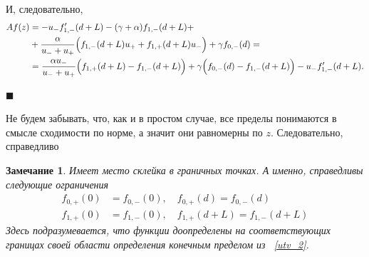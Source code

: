 \documentclass[12pt,a4paper]{article}
\newtheorem{zam}{Замечание}
\begin{document}
И, следовательно,
\begin{equation*}
    \begin{aligned}
   A f(z) &= -u_- f_{1,-}' (d + L) - (\gamma + \alpha) f_{1,-} (d + L) + \\
   &+ \frac{\alpha}{u_- + u_+} \Bigl(f_{1,-} (d + L) u_+ + f_{1,+} (d + L) u_- \Bigr) + \gamma f_{0,-} (d) = \\
& = \frac{\alpha u_-}{u_- + u_+} \Bigl(f_{1,+} (d + L) - f_{1,-} (d + L)\Bigr) + \gamma \Bigl( f_{0,-} (d) - f_{1,-} (d + L) \Bigr) - u_- f_{1,-}' (d + L).
    \end{aligned}
\end{equation*}
\begin{flushright}
$\blacksquare$
\end{flushright}

Не будем забывать, что, как и в простом случае, все пределы понимаются в смысле сходимости по норме, а значит они равномерны по $z$. Следовательно, справедливо
\begin{zam}
Имеет место склейка в граничных точках. А именно, справедливы следующие ограничения
\begin{equation}\label{restrict_2}
\begin{aligned} 
  f_{0, +}(0) &= f_{0, -}(0), \quad f_{0, +}(d) = f_{0, -}(d)\\
  f_{1, +}(0) &= f_{1, -}(0), \quad f_{1, +}(d + L) = f_{1, -}(d + L)
\end{aligned}
\end{equation}
Здесь подразумевается, что функции доопределены на соответствующих границах своей области определения конечным пределом из ~\eqref{utv_2}.
\end{zam}
\end{document}
